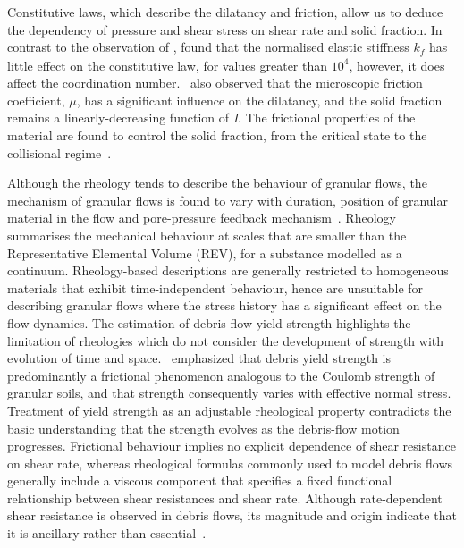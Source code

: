 
Constitutive laws, which describe the dilatancy and friction, allow us to 
deduce the dependency of pressure and shear stress on shear rate and solid 
fraction. In contrast to the observation of \citet{Campbell2002}, 
\citet{DaCruz2005} found that the normalised elastic stiffness $\mathit{k_f}$ 
has 
little effect on the constitutive law, for values greater than $10^{4}$, 
however, it does affect the coordination number.~\citet{DaCruz2005} also 
observed that the microscopic friction coefficient, $\mu$, has a significant 
influence on the dilatancy, and the solid fraction remains a 
linearly-decreasing function of \textit{I}. The 
frictional properties of the material are found to control the solid fraction, 
from the critical state to the collisional regime~\citep{DaCruz2005}. 

Although the rheology tends to describe the behaviour of granular flows, the 
mechanism of granular flows is found to vary with duration, position of 
granular material in the flow and pore-pressure feedback 
mechanism~\citep{Iverson2003}. Rheology summarises the mechanical behaviour at 
scales that are smaller than the Representative Elemental Volume (REV), 
for a substance modelled as a continuum. Rheology-based descriptions are 
generally restricted to homogeneous materials that exhibit time-independent 
behaviour, hence are unsuitable for describing granular flows where the stress 
history has a significant effect on the flow dynamics. The estimation of debris 
flow yield strength highlights the limitation of rheologies which do not 
consider the development of strength with evolution of time and 
space.~\citet{Johnson1965} emphasized that debris yield strength is 
predominantly a frictional phenomenon analogous to the Coulomb strength of 
granular soils, and that strength consequently varies with effective normal 
stress. Treatment of yield strength as an adjustable rheological property 
contradicts the basic understanding that the strength evolves as the 
debris-flow motion progresses. Frictional behaviour implies no explicit 
dependence of shear resistance on shear rate, whereas rheological formulas 
commonly used to model debris flows generally include a viscous component that 
specifies a fixed functional relationship between shear resistances and shear 
rate. Although rate-dependent shear resistance is observed in debris flows, its 
magnitude and origin indicate that it is ancillary rather than 
essential~\citep{Iverson2003}.

